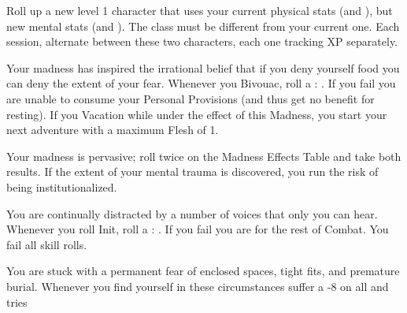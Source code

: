 {  

  Roll up a new level 1 character that uses your current physical stats (\VIG and \DEX), but new mental stats (\INT and \FOC). The class must be different from your current one. Each session, alternate between these two characters, each one tracking XP separately.

  \cbreak


  Your madness has inspired the irrational belief that if you deny yourself food you can deny the extent of your fear. Whenever you Bivouac, roll a \RS : \FOC.  If you fail you are unable to consume your Personal Provisions (and thus get no benefit for resting).  If you Vacation while under the effect of this Madness, you start your next adventure with a maximum Flesh of 1.



  Your madness is pervasive; roll twice on the Madness Effects Table and take both results. If the extent of your mental trauma is discovered, you run the risk of being institutionalized.


  You are continually distracted by a number of voices that only you can hear. Whenever you roll Init, roll a \RS : \FOC.  If you fail you are  for the rest of Combat. You fail all  skill rolls.


  You are stuck with a permanent fear of enclosed spaces, tight fits, and premature burial. Whenever you find yourself in these circumstances suffer a -8 on all \RO and \RB tries

} %
